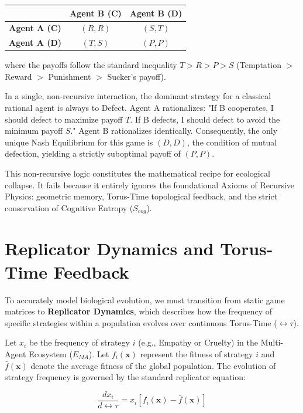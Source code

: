 \documentclass[12pt,openany]{book}
\begin{document}
\begin{table}[h]
\centering
\begin{tabular}{c|c|c}
& \textbf{Agent B (C)} & \textbf{Agent B (D)} \\
\hline
\textbf{Agent A (C)} & $(R, R)$ & $(S, T)$ \\
\hline
\textbf{Agent A (D)} & $(T, S)$ & $(P, P)$ \\
\end{tabular}
\end{table}

where the payoffs follow the standard inequality $T > R > P > S$ (Temptation $>$ Reward $>$ Punishment $>$ Sucker's payoff).

In a single, non-recursive interaction, the dominant strategy for a classical rational agent is always to Defect. Agent A rationalizes: "If B cooperates, I should defect to maximize payoff $T$. If B defects, I should defect to avoid the minimum payoff $S$." Agent B rationalizes identically. Consequently, the only unique Nash Equilibrium for this game is $(D,D)$, the condition of mutual defection, yielding a strictly suboptimal payoff of $(P,P)$.

This non-recursive logic constitutes the mathematical recipe for ecological collapse. It fails because it entirely ignores the foundational Axioms of Recursive Physics: geometric memory, Torus-Time topological feedback, and the strict conservation of Cognitive Entropy ($S_{cog}$).

\section{Replicator Dynamics and Torus-Time Feedback}
To accurately model biological evolution, we must transition from static game matrices to \textbf{Replicator Dynamics}, which describes how the frequency of specific strategies within a population evolves over continuous Torus-Time ($\leftrightarrow\tau$). 

Let $x_i$ be the frequency of strategy $i$ (e.g., Empathy or Cruelty) in the Multi-Agent Ecosystem ($E_{MA}$). Let $f_i(\mathbf{x})$ represent the fitness of strategy $i$ and $\bar{f}(\mathbf{x})$ denote the average fitness of the global population. The evolution of strategy frequency is governed by the standard replicator equation:

\begin{equation}
\frac{dx_i}{d\leftrightarrow\tau} = x_i [f_i(\mathbf{x}) - \bar{f}(\mathbf{x})]
\end{equation}
\end{document}
